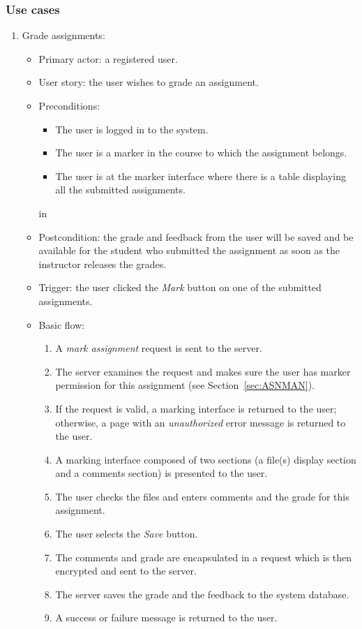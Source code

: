 \subsubsection{Use cases}
\begin{enumerate}
\item Grade assignments:
\begin{itemize}
    \item Primary actor: a registered user.
    \item User story: the user wishes to grade an assignment.
    \item Preconditions:
        \begin{itemize}
            \item The user is logged in to the system.
            \item The user is a marker in the course
                to which the assignment belongs.
            \item The user is at the marker interface where there
                is a table displaying all the submitted assignments.
        \end{itemize}
     in
    \item Postcondition:
            the grade and feedback from the user will be saved and be
            available for the student who submitted the assignment as soon
            as the instructor releases the grades.
    \item Trigger:
        the user clicked the \emph{Mark} button on one of the submitted
        assignments.
    \item Basic flow:
        \begin{enumerate}
            \item A \emph{mark assignment} request is sent to the server.
            \item The server examines the request and makes sure the user has
                marker permission for this assignment
                (see Section~\ref{sec:ASNMAN}).
            \item If the request is valid, a marking interface is returned to
                the user; otherwise, a page with an \emph{unauthorized} error
                message is returned to the user.
            \item A marking interface composed of two sections
                (a file(s) display section and a comments section)
                is presented to the user.
            \item The user checks the files and enters comments and the
                grade for this assignment.
            \item The user selects the \emph{Save} button.
            \item The comments and grade are encapsulated in a request which
                is then encrypted and sent to the server.
            \item The server saves the grade and the feedback to the system
                database.
            \item A success or failure message is returned to the user.
        \end{enumerate}
\end{itemize}
\end{enumerate}

